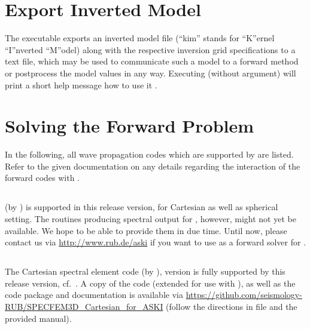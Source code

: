 \section{Export Inverted Model} \label{basic_steps,sec:export_kim}
%
The executable  exports an inverted model file (``kim'' stands for ``K''ernel 
``I''nverted ``M''odel) along with the respective inversion grid specifications to a text file, 
which may be used to communicate such a model to a forward method or postprocess the model values in any way. 
Executing  (without argument) will print a short help message how to use it 
.
%
\section{Solving the Forward Problem} \label{basic_steps,sec:forward_problem}
%
In the following, all wave propagation codes which are supported by \ASKI{} are listed.
Refer to the given documentation on any details regarding the interaction of the forward codes with \ASKI{}.
\subsection*{}
 (by \cite{friederich_wd1995}) is supported in this release version, for Cartesian as well as spherical setting. 
The  routines producing spectral output for \ASKI{}, however, might not yet be available. 
We hope to be able to provide them in due time. Until now, please contact us via \url{http://www.rub.de/aski}
if you want to use  as a forward solver for \ASKI{}.
\subsection*{}
The Cartesian spectral element code  (by \cite{TrKoLi08}), 
version  is fully supported by this \ASKI{} release version, cf.~\cite{Specfem3D_Cartesian_for_ASKI}.
A copy of the code (extended for use with \ASKI{}), as well as the code package 
and documentation is available via \url{https://github.com/seismology-RUB/SPECFEM3D_Cartesian_for_ASKI}
(follow the directions in file  and the provided manual).
